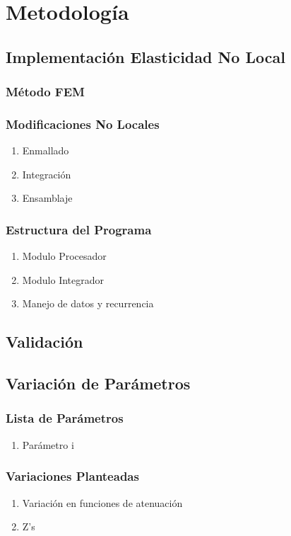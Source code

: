 \section{Metodología}
\label{sc:metodos}
	\subsection{Implementación Elasticidad No Local}
	\label{sub:implementación}
		\subsubsection{Método FEM}
		\subsubsection{Modificaciones No Locales}
			\begin{enumerate}
				\item Enmallado
				\item Integración
				\item Ensamblaje
			\end{enumerate}
		\subsubsection{Estructura del Programa}
			\begin{enumerate}
				\item Modulo Procesador
				\item Modulo Integrador
				\item Manejo de datos y recurrencia
			\end{enumerate}

	\subsection{Validación}
	\label{sub:validacion}

	\subsection{Variación de Parámetros}
	\label{sub:variacion}

		\subsubsection{Lista de Parámetros}
			\begin{enumerate}
				\item Parámetro i
			\end{enumerate}
		\subsubsection{Variaciones Planteadas}
			\begin{enumerate}
				\item Variación en funciones de atenuación
				\item Z's
			\end{enumerate}